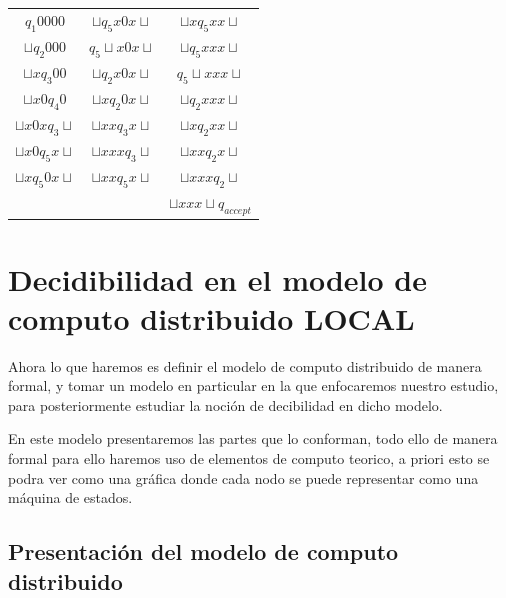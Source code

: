 \documentclass[10pt]{report}
\begin{document}
    \begin{center}
        \begin{tabular}{c c c}
            $q_{1}0000$ &     $\sqcup q_{5}x0x\sqcup$ & $\sqcup xq_{5}xx\sqcup$ \\
            $\sqcup q_{2}000$ & $q_{5}\sqcup x0x\sqcup$ & $\sqcup q_{5}xxx\sqcup$\\
            $\sqcup xq_{3}00$ & $\sqcup q_{2}x0x\sqcup$ & $q_{5}\sqcup xxx\sqcup$\\
            $\sqcup x0q_{4}0$  & $\sqcup xq_{2}0x\sqcup$ &   $\sqcup q_{2}xxx\sqcup$\\
            $\sqcup x0xq_{3}\sqcup$ & $\sqcup xxq_{3}x\sqcup$ & $\sqcup xq_{2}xx\sqcup$ \\
            $\sqcup x0q_{5}x\sqcup$ & $\sqcup xxxq_{3}\sqcup$ & $\sqcup xxq_{2}x\sqcup$ \\
            $\sqcup xq_{5}0x\sqcup$ & $\sqcup xxq_{5}x\sqcup$ & $\sqcup xxxq_{2}\sqcup$ \\
                            &                                 & $\sqcup xxx\sqcup q_{accept}$ \\
        \end{tabular}
    \end{center}


    \section{Decidibilidad en el modelo de computo distribuido  \textbf{LOCAL}}\label{sec:decidibilidad-en-el-modelo-de-computo-distribuidotextbf}
    Ahora lo que haremos es definir el modelo de computo distribuido de manera formal,
    y tomar un modelo en particular en la que enfocaremos nuestro estudio, para posteriormente
    estudiar la noción de decibilidad en dicho modelo.\newline

    En este modelo presentaremos las partes que lo conforman, todo ello de manera formal para ello
    haremos uso de elementos de computo teorico, a priori esto se podra ver como una gráfica donde cada
    nodo se puede representar como una máquina de estados.



    \subsection{Presentación del modelo de computo distribuido}\label{subsec:presentación-del-modelo-de-computo-distribuido}
\end{document}
